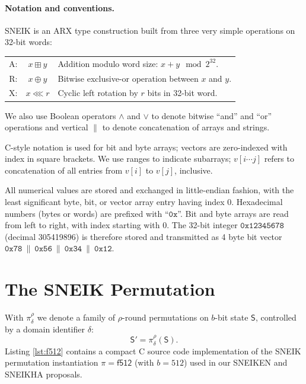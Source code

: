 \documentclass{iacrtrans}
\newcommand{\msf}[1]{\mathsf{#1}}
\newcommand{\mtt}[1]{\mathtt{#1}}
\begin{document}
	\paragraph{Notation and conventions.} 
	SNEIK is an ARX \cite{DBLP:conf/fse/KhovratovichN10} type construction built
	from three very simple operations on 32-bit words:
	\begin{center}
	\begin{tabular}{r c l}
	A: 	& $x \boxplus y$	
		& Addition modulo word size: $x + y ~ \bmod 2^{32}$. \\
	R: 	& $x \oplus y$	
		& Bitwise exclusive-or operation between $x$ and $y$. \\
	X: 	& $x \lll r$
		& Cyclic left rotation by $r$ bits in 32-bit word. \\
	\end{tabular}
	\end{center}
	We also use Boolean operators $\land$ and $\lor$ to denote 
	bitwise ``and'' and ``or'' operations and vertical $\|$ to denote 
	concatenation of arrays and strings. 

	C-style notation is used for bit and byte arrays;
	vectors are zero-indexed with index in square brackets. 
	We use ranges to indicate subarrays; $v[i \cdots j]$ refers to 
	concatenation of all entries from $v[i]$ to $v[j]$, inclusive.

	All numerical values are stored and exchanged
	in little-endian fashion, with the least significant byte, bit, or vector
	array entry having index 0. Hexadecimal numbers (bytes or words) are 
	prefixed with ``$\mtt{0x}$''. Bit and byte arrays are read from 
	left to right, with index starting with 0. The 32-bit integer 
	$\mtt{0x12345678}$ (decimal 305419896) is therefore stored and 
	transmitted as 4 byte bit vector
	$\mtt{0x78}~\|~\mtt{0x56}~\|~\mtt{0x34}~\|~\mtt{0x12}$.


\section{The SNEIK Permutation}
\label{sec:sneik}

	With $\pi^\rho_\delta$ we denote a family of $\rho$-round 
	permutations on $b$-bit state $\msf{S}$, controlled by a 
	domain identifier $\delta$:
	\begin{equation}
		\label{eqn:f512}
		\msf{S}' = \pi^\rho_\delta(\msf{S}).
	\end{equation}
	Listing \ref{lst:f512} contains a compact C source code 
	implementation of the SNEIK permutation instantiation $\pi = \msf{f512}$
	(with $b=512$) used in our SNEIKEN and SNEIKHA proposals.
\end{document}
